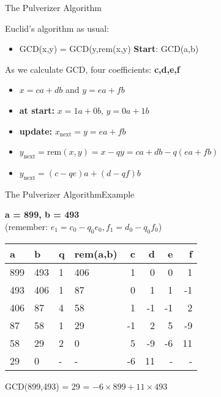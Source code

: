 \begin{frame}{The Pulverizer Algorithm}

     Euclid's algorithm as usual:
    \begin{itemize}
    \item GCD(x,y) = GCD(y,rem(x,y)\hspace{2cm} {\bf Start}: GCD(a,b)
    \end{itemize}

    \bigskip

    As we calculate GCD,  four coefficients: {\bf c,d,e,f}
    \begin{itemize}
    \item $x = ca+db$ and $y = ea+fb$
    \item {\bf at start:} $x = 1a + 0b$, $y = 0a+1b$
    \item {\bf update:} $x_{\text{next}} = y = ea + fb$
    \item $y_{\text{next}} =
      \text{rem}(x,y) = x - qy =
      ca+db-q(ea+fb)$
    \item $y_{\text{next}} = (c-qe)a+(d-qf)b$
    \end{itemize}
\end{frame}

\begin{frame}{The Pulverizer Algorithm}{Example}

    {\bf a = 899, b = 493}\\
    \hfill (remember: $e_1 = c_0-q_0e_0, f_1 = d_0 - q_0f_0$)

    \vfill

    \begin{tabular}{l|l|l|l|r|r|r|r}
      a & b & q & rem(a,b) & c & d & e & f\\
      \hline
      899 & 493 & 1 & 406 & 1 & 0 & 0 & 1\\
      493 & 406 & 1 & 87 & 0 & 1 & 1 & -1\\
      406 & 87 & 4 & 58 & 1 & -1 & -1 & 2\\
      87 & 58 & 1 & 29 & -1 & 2 & 5 & -9\\
      58 & 29 & 2 & 0 & 5 & -9 & -6 & 11\\
      29 & 0 & - & - & -6 & 11 & - & -\\
    \end{tabular}

    \begin{center}
      GCD(899,493) = 29 = $-6\times 899 +11\times 493$
    \end{center}
\end{frame}

